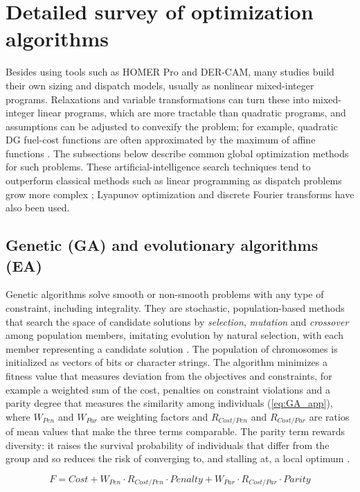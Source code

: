 \documentclass[final,3p,times]{elsarticle}
\begin{document}
\section{Detailed survey of optimization algorithms \label{app:opt_alg}}

Besides using tools such as HOMER Pro and DER-CAM, many studies build their own sizing and dispatch models, usually as nonlinear mixed-integer programs. Relaxations and variable transformations can turn these into mixed-integer linear programs, which are more tractable than quadratic programs, and assumptions can be adjusted to convexify the problem; for example, quadratic DG fuel-cost functions are often approximated by the maximum of affine functions \cite{parisio2014}. The subsections below describe common global optimization methods for such problems. These artificial-intelligence search techniques tend to outperform classical methods such as linear programming as dispatch problems grow more complex \cite{Qu2018}; Lyapunov optimization \cite{pathak2017} and discrete Fourier transforms \cite{dft} have also been used.

\subsection{Genetic (GA) and evolutionary algorithms (EA)}

Genetic algorithms solve smooth or non-smooth problems with any type of constraint, including integrality. They are stochastic, population-based methods that search the space of candidate solutions by \textit{selection}, \textit{mutation} and \textit{crossover} among population members, imitating evolution by natural selection, with each member representing a candidate solution \cite{nemati2015}. The population of chromosomes is initialized as vectors of bits or character strings. The algorithm minimizes a fitness value that measures deviation from the objectives and constraints, for example a weighted sum of the cost, penalties on constraint violations and a parity degree that measures the similarity among individuals (\cref{eq:GA_app}), where $W_{Pen}$ and $W_{Par}$ are weighting factors and $R_{Cost/Pen}$ and $R_{Cost/Par}$ are ratios of mean values that make the three terms comparable. The parity term rewards diversity: it raises the survival probability of individuals that differ from the group and so reduces the risk of converging to, and stalling at, a local optimum \cite{nemati2015}.

\begin{equation}
    F = Cost + W_{Pen} \cdot R_{Cost/Pen} \cdot Penalty + W_{Par} \cdot R_{Cost/Par} \cdot Parity
    \label{eq:GA_app}
\end{equation}
\end{document}
